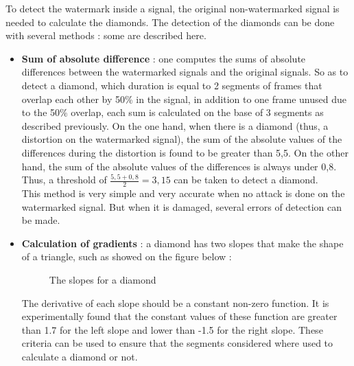 To detect the watermark inside a signal, the original non-watermarked signal is needed to calculate the diamonds. The detection of the diamonds can be done with several methods : some are described here.\\
\begin{itemize}
\item \textbf{Sum of absolute difference} : one computes the sums of absolute differences between the watermarked signals and the original signals. So as to detect a diamond, which duration is equal to 2 segments of frames that overlap each other by 50\% in the signal, in addition to one frame unused due to the 50\% overlap, each sum is calculated on the base of 3 segments as described previously. On the one hand, when there is a diamond (thus, a distortion on the watermarked signal), the sum of the absolute values of the differences during the distortion is found to be greater than 5,5. On the other hand, the sum of the absolute values of the differences is always under 0,8. Thus, a threshold of $\frac{5,5 + 0,8}{2} = 3,15$ can be taken to detect a diamond.\\
This method is very simple and very accurate when no attack is done on the watermarked signal. But when it is damaged, several errors of detection can be made.
\item \textbf{Calculation of gradients} : a diamond has two slopes that make the shape of a triangle, such as showed on the figure below :
\begin{figure}[H]
\caption{\label{slopes} The slopes for a diamond}
\end{figure}
The derivative of each slope should be a constant non-zero function. It is experimentally found that the constant values of these function are greater than 1.7 for the left slope and lower than -1.5 for the right slope. These criteria can be used to ensure that the segments considered where used to calculate a diamond or not.\\

\end{itemize}
